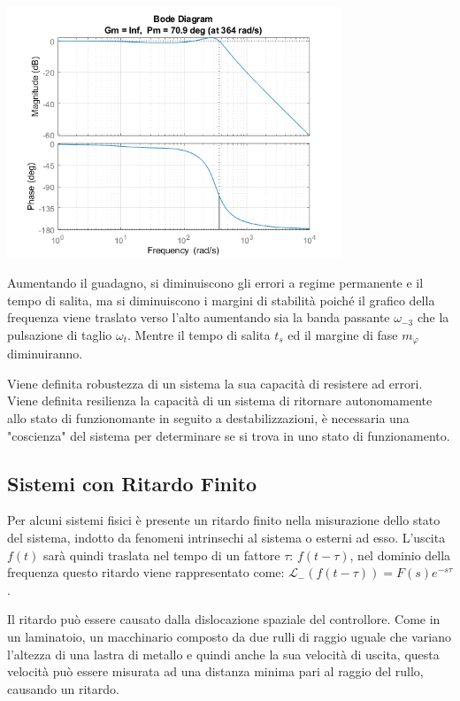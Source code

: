 \documentclass{article}
\numberwithin{equation}{subsection}
\begin{document}
\begin{center}
    \includegraphics[width=10cm]{Bode3.png}
\end{center}

Aumentando il guadagno, si diminuiscono gli errori a regime permanente e il tempo di salita, ma si diminuiscono i margini di stabilità poiché il grafico della frequenza 
viene traslato verso l'alto aumentando sia la banda passante $\omega_{-3}$ che la pulsazione di taglio $\omega_t$. Mentre il tempo di salita $t_s$ ed il margine di fase 
$m_{\varphi}$ diminuiranno. 



Viene definita robustezza di un sistema la sua capacità di resistere ad errori. Viene definita resilienza la capacità di un sistema di ritornare 
autonomamente allo stato di funzionomante in seguito a destabilizzazioni, è necessaria una "coscienza" del sistema per determinare se si trova in uno stato di funzionamento. 

\subsection{Sistemi con Ritardo Finito}

Per alcuni sistemi fisici è presente un ritardo finito nella misurazione dello stato del sistema, indotto da fenomeni intrinsechi al sistema o esterni ad esso. 
L'uscita $f(t)$ sarà quindi traslata nel tempo di un fattore $\tau$: $f(t-\tau)$, nel dominio della frequenza questo ritardo viene rappresentato come: 
$\mathscr{L}_-(f(t-\tau))=F(s)e^{-s\tau}$. 

Il ritardo può essere causato dalla dislocazione spaziale del controllore. Come in un laminatoio, un macchinario composto da due rulli di raggio uguale 
che variano l'altezza di una lastra di metallo e quindi anche la sua velocità di uscita, questa velocità può essere misurata ad una distanza minima 
pari al raggio del rullo, causando un ritardo. 
\end{document}
